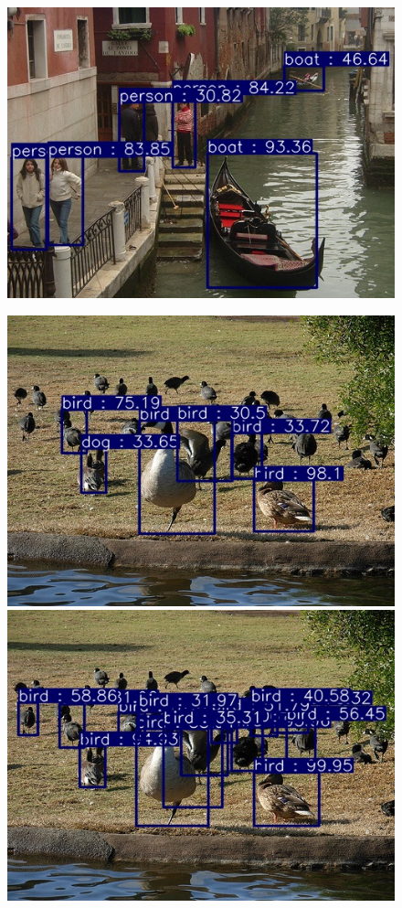 \documentclass[a4paper]{article}
\begin{document}
\begin{figure}[h]
\begin{multicols}{2}
		\includegraphics[width=0.7\linewidth]{fig/VOC_FPN_578}
	\end{multicols}
	\begin{multicols}{2}
		\includegraphics[width=0.7\linewidth]{fig/VOC_638}
		\includegraphics[width=0.7\linewidth]{fig/VOC_FPN_638}
	\end{multicols}
	\begin{multicols}{2}

\end{multicols}
\end{figure}
\end{document}

